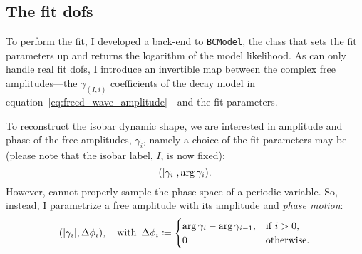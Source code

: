 \subsection{The fit \acp{dof}}

    To perform the fit, I developed a back-end to \lstinline!BCModel!, the  class that sets the fit parameters up and returns the logarithm of the model likelihood.
    As  can only handle real fit \acp{dof}, I introduce an invertible map between the complex free amplitudes---the $\gamma_{(I,i)}$ coefficients of the decay model in equation~\eqref{eq:freed_wave_amplitude}---and the fit parameters. %


    To reconstruct the isobar dynamic shape, we are interested in amplitude and phase of the free amplitudes, $\gamma_i$, namely a choice of the fit parameters may be (please note that the isobar label, $I$, is now fixed):
    \begin{equation}
        (\lvert\gamma_i\rvert, \arg\gamma_i).
    \end{equation}
    However,  cannot properly sample the phase space of a periodic variable.
    So, instead, I parametrize a free amplitude with its amplitude and \emph{phase motion}:
    \begin{equation}
        (\lvert\gamma_i\rvert, \mathop{}\!\textup{$\Delta$} \phi_i),\quad\text{with }
        \mathop{}\!\textup{$\Delta$} \phi_i \coloneqq
        \begin{cases}
            \arg\gamma_i - \arg\gamma_{i-1},    &\text{if }i > 0,\\
            0                                   &\text{otherwise}.
        \end{cases}
    \end{equation}




